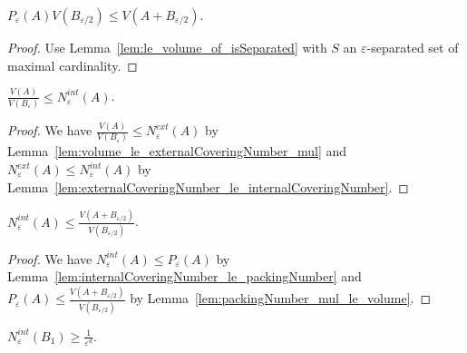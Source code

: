 \begin{lemma}\label{lem:packingNumber_mul_le_volume}
  \leanok
$P_\varepsilon(A) V(B_{\varepsilon/2}) \le V(A + B_{\varepsilon/2})$.
\end{lemma}

\begin{proof}
Use Lemma~\ref{lem:le_volume_of_isSeparated} with $S$ an $\varepsilon$-separated set of maximal cardinality.
\end{proof}


\begin{lemma}\label{lem:volume_div_le_internalCoveringNumber}
  \leanok
$\frac{V(A)}{V(B_\varepsilon)} \le N^{int}_\varepsilon(A)$.
\end{lemma}

\begin{proof}
We have $\frac{V(A)}{V(B_\varepsilon)} \le N^{ext}_\varepsilon(A)$ by Lemma~\ref{lem:volume_le_externalCoveringNumber_mul} and $N^{ext}_\varepsilon(A) \le N^{int}_\varepsilon(A)$ by Lemma~\ref{lem:externalCoveringNumber_le_internalCoveringNumber}.
\end{proof}


\begin{lemma}\label{lem:internalCoveringNumber_le_volume_div}
  \leanok
$N^{int}_\varepsilon(A) \le \frac{V(A + B_{\varepsilon/2})}{V(B_{\varepsilon/2})}$.
\end{lemma}

\begin{proof}
We have $N^{int}_\varepsilon(A) \le P_\varepsilon(A)$ by Lemma~\ref{lem:internalCoveringNumber_le_packingNumber} and $P_\varepsilon(A) \le \frac{V(A + B_{\varepsilon/2})}{V(B_{\varepsilon/2})}$ by Lemma~\ref{lem:packingNumber_mul_le_volume}.
\end{proof}


\begin{lemma}\label{lem:internalCoveringNumber_closedBall_ge}
  \leanok
$N_\varepsilon^{int}(B_1) \ge \frac{1}{\varepsilon^d}$.
\end{lemma}

